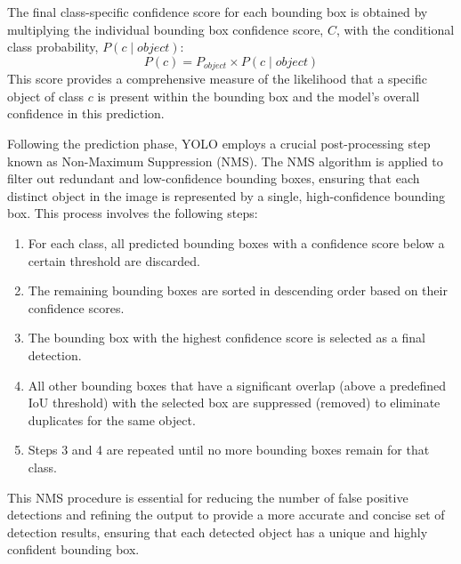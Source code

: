 The final class-specific confidence score for each bounding box is obtained by multiplying the individual bounding box confidence score, $C$, with the conditional class probability, $P(c \mid object)$:
$$
P(c) = P_{object} \times P(c \mid object)
$$
This score provides a comprehensive measure of the likelihood that a specific object of class $c$ is present within the bounding box and the model's overall confidence in this prediction.

Following the prediction phase, YOLO employs a crucial post-processing step known as Non-Maximum Suppression (NMS). The NMS algorithm is applied to filter out redundant and low-confidence bounding boxes, ensuring that each distinct object in the image is represented by a single, high-confidence bounding box. This process involves the following steps:
\begin{enumerate}
    \item For each class, all predicted bounding boxes with a confidence score below a certain threshold are discarded.
    \item The remaining bounding boxes are sorted in descending order based on their confidence scores.
    \item The bounding box with the highest confidence score is selected as a final detection.
    \item All other bounding boxes that have a significant overlap (above a predefined IoU threshold) with the selected box are suppressed (removed) to eliminate duplicates for the same object.
    \item Steps 3 and 4 are repeated until no more bounding boxes remain for that class.
\end{enumerate}
This NMS procedure is essential for reducing the number of false positive detections and refining the output to provide a more accurate and concise set of detection results, ensuring that each detected object has a unique and highly confident bounding box.
